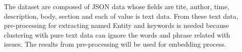 The dataset are composed of JSON data whose fields are tite, author, time, description, body, section and each of value is text data. From these text data, pre-processing for extracting named Entity and keywords is needed because clustering with pure text data can ignore the words and phrase related with issues. The results from pre-processing will be used for embedding process.